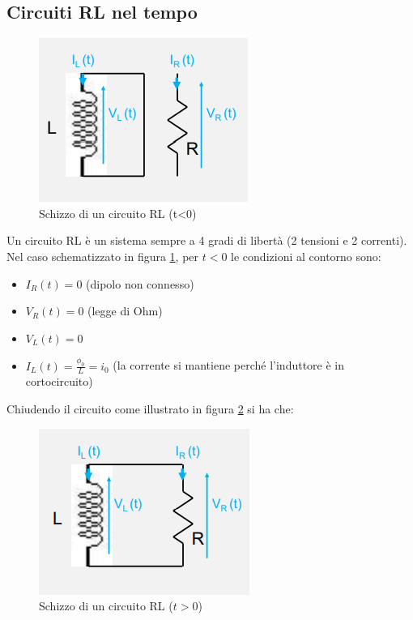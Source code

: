 \documentclass{article}
\begin{document}
\subsection{Circuiti RL nel tempo}

\begin{figure}[h]
  \centering
  \includegraphics[scale=0.7]{IM_circuito_RL}
  \caption{Schizzo di un circuito RL (t<0)}
  \label{Schema_circuito_RL}
\end{figure}

Un circuito RL è un sistema sempre a 4 gradi di libertà (2 tensioni e 2 correnti). Nel caso schematizzato in figura \ref{Schema_circuito_RL}, per $t<0$ le condizioni al contorno sono:

\begin{itemize}
  \item $I_R (t) = 0$ (dipolo non connesso)
  \item $V_R (t) = 0$ (legge di Ohm)
  \item $V_L (t) = 0$
  \item $I_L (t) = \frac{\phi _0}{L} = i_0$ (la corrente si mantiene perché l'induttore è in cortocircuito)
\end{itemize}
\newpage
Chiudendo il circuito come illustrato in figura \ref{Schema_circuito_RL_chiuso} si ha che:

\begin{figure}[h]
  \centering
  \includegraphics[scale=0.7]{IM_circuito_RL_chiuso}
  \caption{Schizzo di un circuito RL ($t>0$)}
  \label{Schema_circuito_RL_chiuso}
\end{figure}
\end{document}
